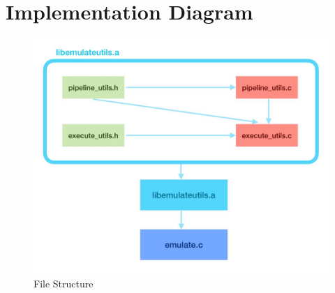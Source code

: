 \documentclass[11pt]{article}
\begin{document}
\appendix{}
\section{Implementation Diagram}
\begin{figure}[h!]
\centering
\includegraphics[scale=0.3]{diagram.jpg}
\caption{File Structure}
\end{figure}
\end{document}
